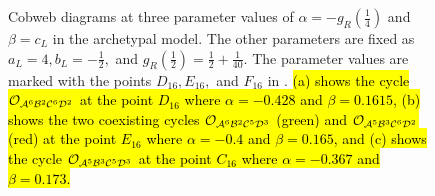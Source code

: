 \begin{figure}
	\centering
	\caption[Cobweb diagrams of the archetypal model]{
		Cobweb diagrams at three parameter values of $\alpha = -g_R\left(\frac{1}{4}\right)$ and $\beta = c_L$ in the archetypal model.
		The other parameters are fixed as $a_L = 4, b_L = -\frac{1}{2},$ and $g_R\left(\frac{1}{2}\right) = \frac{1}{2} + \frac{1}{40}$.
		The parameter values are marked with the points $D_{16}, E_{16},$ and $F_{16}$ in .
		\hl{
			(a) shows the cycle $\mathcal{O}_{\mathcal{A}^6\mathcal{B}^2\mathcal{C}^6\mathcal{D}^2}$ at the point $D_{16}$ where $\alpha = -0.428$ and $\beta = 0.1615$,
			(b) shows the two coexisting cycles $\mathcal{O}_{\mathcal{A}^6\mathcal{B}^2\mathcal{C}^5\mathcal{D}^3}$ (green) and $\mathcal{O}_{\mathcal{A}^5\mathcal{B}^3\mathcal{C}^6\mathcal{D}^2}$ (red) at the point $E_{16}$ where $\alpha = -0.4$ and $\beta = 0.165$,
			and (c) shows the cycle $\mathcal{O}_{\mathcal{A}^5\mathcal{B}^3\mathcal{C}^5\mathcal{D}^3}$ at the point $C_{16}$ where $\alpha = -0.367$ and $\beta = 0.173$.
		}
	}
	\label{fig:arch.dyn.cobwebs.2}
\end{figure}

